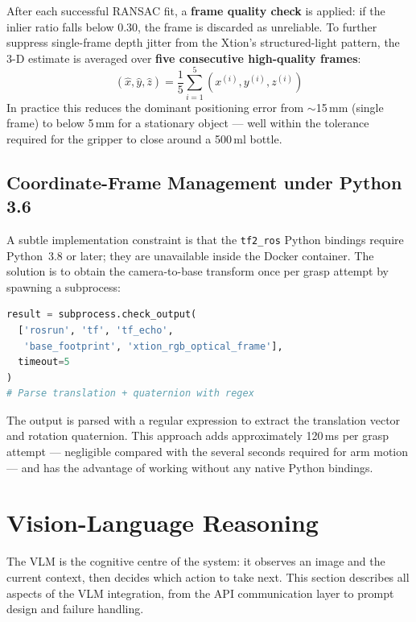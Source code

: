 After each successful RANSAC fit, a \textbf{frame quality check} is applied:
if the inlier ratio falls below 0.30, the frame is discarded as unreliable.
To further suppress single-frame depth jitter from the Xtion's structured-light
pattern, the 3-D estimate is averaged over \textbf{five consecutive
high-quality frames}:
\begin{equation}
  (\hat{x},\hat{y},\hat{z}) =
  \frac{1}{5}\sum_{i=1}^{5}(x^{(i)},y^{(i)},z^{(i)})
\end{equation}
In practice this reduces the dominant positioning error from
$\sim$15\,mm (single frame) to below 5\,mm for a stationary object ---
well within the tolerance required for the gripper to close around a 500\,ml
bottle.

\subsection{Coordinate-Frame Management under Python 3.6}

A subtle implementation constraint is that the \texttt{tf2\_ros} Python
bindings require Python~3.8 or later; they are unavailable inside the
Docker container.
The solution is to obtain the camera-to-base transform once per grasp attempt
by spawning a subprocess:

\begin{lstlisting}[language=Python, numbers=none]
result = subprocess.check_output(
  ['rosrun', 'tf', 'tf_echo',
   'base_footprint', 'xtion_rgb_optical_frame'],
  timeout=5
)
# Parse translation + quaternion with regex
\end{lstlisting}

The output is parsed with a regular expression to extract the translation
vector and rotation quaternion.
This approach adds approximately 120\,ms per grasp attempt --- negligible
compared with the several seconds required for arm motion --- and has the
advantage of working without any native Python bindings.

\section{Vision-Language Reasoning}
\label{sec:vlm}

The VLM is the cognitive centre of the system: it observes an image and the
current context, then decides which action to take next.
This section describes all aspects of the VLM integration, from the API
communication layer to prompt design and failure handling.

